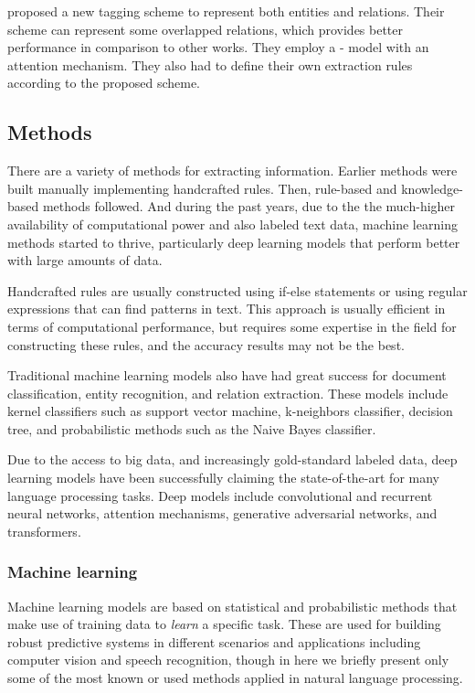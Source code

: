 \textcite{luo2020a} proposed a new tagging scheme to represent both entities and relations.
Their scheme can represent some overlapped relations, which provides better performance in comparison to other works.
They employ a - model with an attention mechanism.
They also had to define their own extraction rules according to the proposed scheme.


\subsection{Methods}

There are a variety of methods for extracting information.
Earlier methods were built manually implementing handcrafted rules.
Then, rule-based and knowledge-based methods followed.
And during the past years, due to the the much-higher availability of computational power and also labeled text data, machine learning methods started to thrive, particularly deep learning models that perform better with large amounts of data.

Handcrafted rules are usually constructed using if-else statements or using regular expressions that can find patterns in text.
This approach is usually efficient in terms of computational performance, but requires some expertise in the field for constructing these rules, and the accuracy results may not be the best.

Traditional machine learning models also have had great success for document classification, entity recognition, and relation extraction.
These models include kernel classifiers such as support vector machine, k-neighbors classifier, decision tree, and probabilistic methods such as the Naive Bayes classifier.

Due to the access to big data, and increasingly gold-standard labeled data, deep learning models have been successfully claiming the state-of-the-art for many language processing tasks.
Deep models include convolutional and recurrent neural networks, attention mechanisms, generative adversarial networks, and transformers.


\subsubsection{Machine learning}

Machine learning models are based on statistical and probabilistic methods that make use of training data to \textit{learn} a specific task.
These are used for building robust predictive systems in different scenarios and applications including computer vision and speech recognition, though in here we briefly present only some of the most known or used methods applied in natural language processing.


